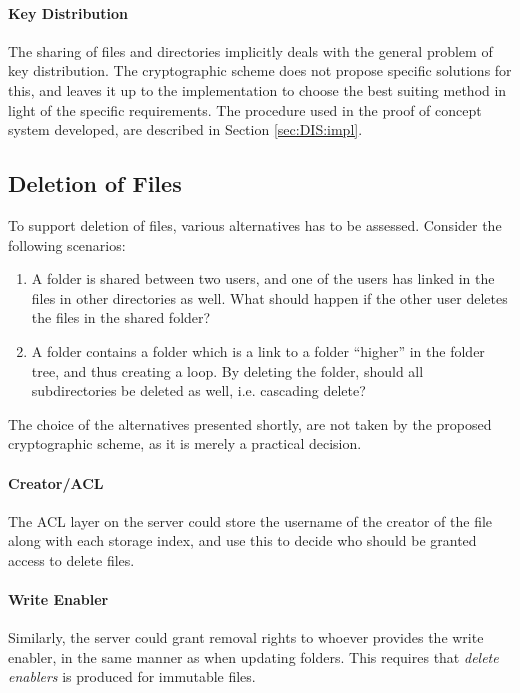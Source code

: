 \documentclass[pdftex,english,10pt,b5paper,twoside]{book}
\begin{document}
\paragraph{Key Distribution} The sharing of files and directories implicitly
deals with the general problem of key distribution. The cryptographic scheme
does not propose specific solutions for this, and leaves it up to the
implementation to choose the best suiting method in light of the specific
requirements. The procedure used in the proof of concept system developed, are
described in Section \ref{sec:DIS:impl}.

\subsection{Deletion of Files}

To support deletion of files, various alternatives has to be assessed.
Consider the following scenarios:

\begin{enumerate}
  \item A folder is shared between two users, and one of the users has
    linked in the files in other directories as well. What should happen if the
    other user deletes the files in the shared folder?

  \item A folder contains a folder which is a link to a folder ``higher''
    in the folder tree, and thus creating a loop. By deleting the folder,
    should all subdirectories be deleted as well, i.e. cascading delete?
\end{enumerate}

The choice of the alternatives presented shortly, are not taken by the proposed
cryptographic scheme, as it is merely a practical decision.

\paragraph{Creator/\ac{ACL}} The \ac{ACL} layer on the server could store the
username of the creator of the file along with each storage index, and use this
to decide who should be granted access to delete files.

\paragraph{Write Enabler} Similarly, the server could grant removal rights to
whoever provides the write enabler, in the same manner as when updating
folders. This requires that \emph{delete enablers} is produced for immutable
files.
\end{document}
